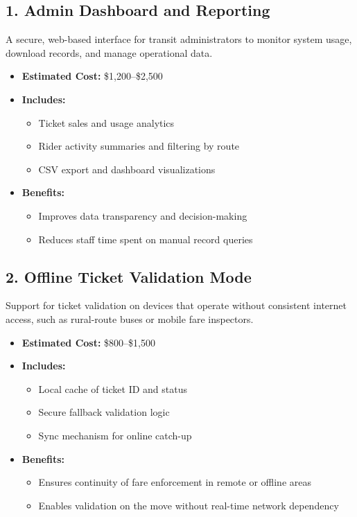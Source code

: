 \documentclass[12pt]{article}
\begin{document}
\subsection*{1. Admin Dashboard and Reporting}

A secure, web-based interface for transit administrators to monitor system usage, download records, and manage operational data.

\begin{itemize}
    \item \textbf{Estimated Cost:} \$1,200–\$2,500
    \item \textbf{Includes:}
    \begin{itemize}
        \item Ticket sales and usage analytics
        \item Rider activity summaries and filtering by route
        \item CSV export and dashboard visualizations
    \end{itemize}
    \item \textbf{Benefits:}
    \begin{itemize}
        \item Improves data transparency and decision-making
        \item Reduces staff time spent on manual record queries
    \end{itemize}
\end{itemize}

\subsection*{2. Offline Ticket Validation Mode}

Support for ticket validation on devices that operate without consistent internet access, such as rural-route buses or mobile fare inspectors.

\begin{itemize}
    \item \textbf{Estimated Cost:} \$800–\$1,500
    \item \textbf{Includes:}
    \begin{itemize}
        \item Local cache of ticket ID and status
        \item Secure fallback validation logic
        \item Sync mechanism for online catch-up
    \end{itemize}
    \item \textbf{Benefits:}
    \begin{itemize}
        \item Ensures continuity of fare enforcement in remote or offline areas
        \item Enables validation on the move without real-time network dependency
    \end{itemize}
\end{itemize}
\end{document}
